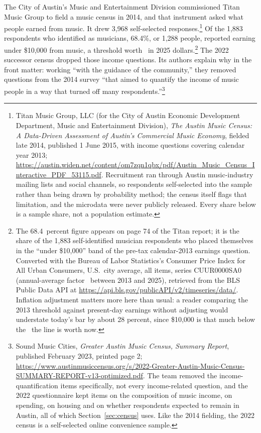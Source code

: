 The City of Austin's Music and Entertainment Division commissioned Titan Music
Group to field a music census in 2014, and that instrument asked what people
earned from music. It drew 3,968 self-selected
responses.\footnote{Titan Music Group, LLC (for the City of Austin Economic
Development Department, Music and Entertainment Division), \textit{The Austin
Music Census: A Data-Driven Assessment of Austin's Commercial Music Economy},
fielded late 2014, published 1 June 2015, with income questions covering
calendar year 2013;
\url{https://austin.widen.net/content/om7zqn1qbx/pdf/Austin_Music_Census_Interactive_PDF_53115.pdf}.
Recruitment ran through Austin music-industry mailing lists and social channels,
so respondents self-selected into the sample rather than being drawn by
probability method; the census itself flags that limitation, and the
microdata were never publicly released. Every share below is a sample share,
not a population estimate.} Of the 1,883 respondents who identified as
musicians, 68.4\%, or 1,288 people, reported earning under \$10,000 from
music, a threshold worth \NPumsMusiccensusTenkTwoZeroTwoFiveusd\ in 2025
dollars.\footnote{The 68.4~percent figure appears on page 74 of the Titan
report; it is the share of the 1,883 self-identified musician respondents who
placed themselves in the ``under \$10,000'' band of the pre-tax
calendar-2013 earnings question. Converted with the Bureau of Labor
Statistics's Consumer Price Index for All Urban Consumers, U.S.\ city average,
all items, series CUUR0000SA0 (annual-average factor
\NPumsDeflTwoZeroOneThreeToTwoZeroTwoFive\ between 2013 and 2025), retrieved
from the BLS Public Data API at
\url{https://api.bls.gov/publicAPI/v2/timeseries/data/}. Inflation adjustment
matters more here than usual: a reader comparing the 2013 threshold against
present-day earnings without adjusting would understate today's bar by about
28 percent, since \$10,000 is that much below the
\NPumsMusiccensusTenkTwoZeroTwoFiveusd\ the line is worth now.} The 2022
successor census dropped those income questions. Its authors explain why in
the front matter: working ``with the guidance of the community,'' they removed
questions from the 2014 survey ``that aimed to quantify the income of music
people in a way that turned off many
respondents.''\footnote{Sound Music Cities, \textit{Greater Austin Music
Census, Summary Report}, published February 2023, printed page 2;
\url{https://www.austinmusiccensus.org/s/2022-Greater-Austin-Music-Census-SUMMARY-REPORT-v13-optimized.pdf}.
The team removed the income-quantification items specifically, not every
income-related question, and the 2022 questionnaire kept items on the
composition of music income, on spending, on housing and on whether
respondents expected to remain in Austin, all of which Section~\ref{sec:census}
uses. Like the 2014 fielding, the 2022 census is a self-selected online
convenience sample.}

